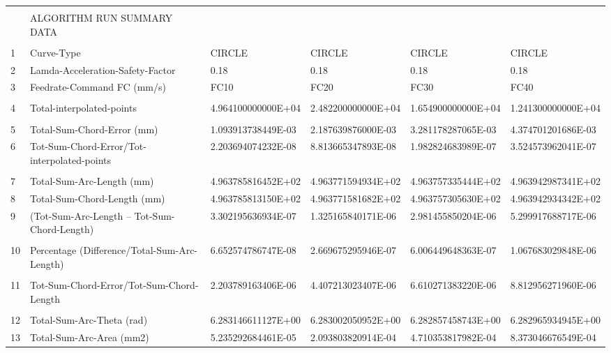 \begin{landscape}
\begin{table}[ht]
{\begin{tabular}{ p{0.4cm} p{8.3cm} p{4.00cm} p{4.0cm} p{4.00cm} p{4.0cm}}
&		&		&		&		&		\\
	&	ALGORITHM RUN SUMMARY DATA	                    &		&		&		&		\\
&		&		&		&		&		\\
1	&	Curve-Type	                                    &	CIRCLE	&	CIRCLE	&	CIRCLE	&	CIRCLE	\\
2	&	Lamda-Acceleration-Safety-Factor	            &	0.18	&	0.18	&	0.18	&	0.18	\\
3	&	Feedrate-Command FC (mm/s)	                    &	FC10	&	FC20	&	FC30	&	FC40	\\
&		&		&		&		&		\\
4	&	Total-interpolated-points	                    &	4.964100000000E+04	&	2.482200000000E+04	&	1.654900000000E+04	&	1.241300000000E+04	\\
&		&		&		&		&		\\
5	&	Total-Sum-Chord-Error (mm) 	                    &	1.093913738449E-03	&	2.187639876000E-03	&	3.281178287065E-03	&	4.374701201686E-03	\\
6	&	Tot-Sum-Chord-Error/Tot-interpolated-points	    &	2.203694074232E-08	&	8.813665347893E-08	&	1.982824683989E-07	&	3.524573962041E-07	\\
&		&		&		&		&		\\
7	&	Total-Sum-Arc-Length (mm)	                    &	4.963785816452E+02	&	4.963771594934E+02	&	4.963757335444E+02	&	4.963942987341E+02	\\
8	&	Total-Sum-Chord-Length (mm)	                    &	4.963785813150E+02	&	4.963771581682E+02	&	4.963757305630E+02	&	4.963942934342E+02	\\
9	&	(Tot-Sum-Arc-Length – Tot-Sum-Chord-Length)	    &	3.302195636934E-07	&	1.325165840171E-06	&	2.981455850204E-06	&	5.299917688717E-06	\\
&		&		&		&		&		\\
10	&	Percentage (Difference/Total-Sum-Arc-Length)	&	6.652574786747E-08	&	2.669675295946E-07	&	6.006449648363E-07	&	1.067683029848E-06	\\
&		&		&		&		&		\\
11	&	Tot-Sum-Chord-Error/Tot-Sum-Chord-Length 	    &	2.203789163406E-06	&	4.407213023407E-06	&	6.610271383220E-06	&	8.812956271960E-06	\\
&		&		&		&		&		\\
12	&	Total-Sum-Arc-Theta (rad)	                    &	6.283146611127E+00	&	6.283002050952E+00	&	6.282857458743E+00	&	6.282965934945E+00	\\
13	&	Total-Sum-Arc-Area (mm2)	                    &	5.235292684461E-05	&	2.093803820914E-04	&	4.710353817982E-04	&	8.373046676549E-04	\\

\end{tabular}}
\end{table}
\end{landscape}
